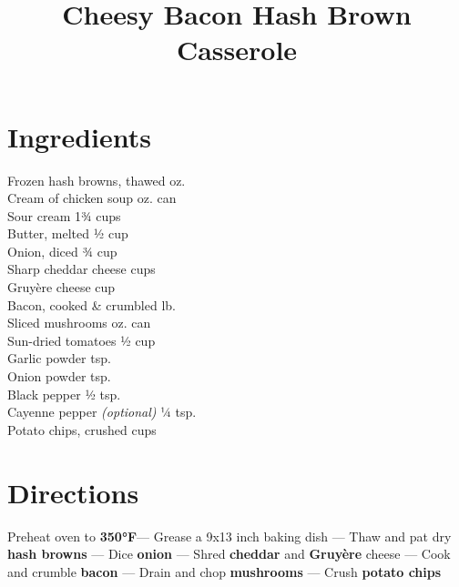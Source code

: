 \documentclass[11pt,letterpaper]{article}
\title{Cheesy Bacon Hash Brown Casserole}
\author{}
\date{}
\begin{document}
\maketitle
\thispagestyle{empty}

\section*{Ingredients}
\setlength{\columnsep}{20pt}
\begin{multicols}{2}
\noindent
    Frozen hash browns, thawed  oz. \\
    Cream of chicken soup  oz. can \\
    Sour cream \dotfill 1¾ cups \\
    Butter, melted \dotfill ½ cup \\
    Onion, diced \dotfill ¾ cup \\
    Sharp cheddar cheese  cups \\
    Gruyère cheese  cup \\
	\columnbreak
    Bacon, cooked \& crumbled  lb. \\
    Sliced mushrooms  oz. can \\
    Sun-dried tomatoes \dotfill ½ cup \\
    Garlic powder  tsp. \\
    Onion powder  tsp. \\
    Black pepper \dotfill ½ tsp. \\
    Cayenne pepper \textit{(optional)} \dotfill ¼ tsp. \\
    Potato chips, crushed  cups \\
\end{multicols}

\section*{Directions}

\noindent
Preheat oven to \textbf{350°F}---
Grease a 9x13 inch baking dish ---
Thaw and pat dry \textbf{hash browns} ---
Dice \textbf{onion} ---
Shred \textbf{cheddar} and \textbf{Gruyère} cheese ---
Cook and crumble \textbf{bacon} ---
Drain and chop \textbf{mushrooms} ---
Crush \textbf{potato chips}
\end{document}
